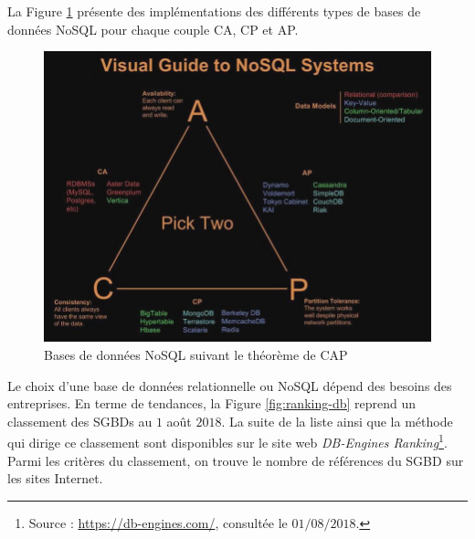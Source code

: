 		La Figure \ref{fig:cap} présente des implémentations des différents types de bases de données NoSQL pour chaque couple CA, CP et AP.
		
		\begin{figure}[h]
			\centering
			\captionsetup{justification=centering}
			\includegraphics[width=1\linewidth]{illustrations/cap}
			\caption{Bases de données NoSQL suivant le théorème de CAP }
			\label{fig:cap}
		\end{figure}
		
		
		
		Le choix d'une base de données relationnelle ou NoSQL dépend des besoins des entreprises. En terme de tendances, la Figure \ref{fig:ranking-db} reprend un classement des SGBDs au $1$ août $ 2018 $. La suite de la liste ainsi que  la méthode qui dirige ce classement sont    disponibles sur le site  web \textit{DB-Engines Ranking}\footnote{Source : \url{https://db-engines.com/},  consultée le $01/08/2018$.}. Parmi les critères du classement, on trouve le nombre de références du SGBD sur les sites Internet. 
		
		
